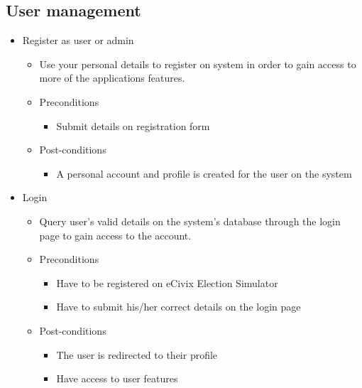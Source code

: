 \documentclass{article}
\begin{document}
   	\subsection{User management} 
   		 \begin{itemize}
    				\item Register as user or admin
				\begin{itemize}
					\item Use your personal details to register on system in order to gain access to more of the applications features.

					\item Preconditions
					\begin{itemize}
						\item Submit details on registration form
					\end{itemize}
					\item Post-conditions
					\begin{itemize}
						\item A personal account and profile is created for the user on the system
					\end{itemize}
				\end{itemize}
				
				\item Login
				\begin{itemize}
					\item Query user’s valid details on the system’s database through the login page to gain access to the account. 
					\item Preconditions
					\begin{itemize}
						\item Have to be registered on eCivix Election Simulator
						\item Have to submit his/her correct details on the login page
					\end{itemize}
					\item Post-conditions
					\begin{itemize}
						\item The user is redirected to their profile
						\item Have access to user features
					\end{itemize}
				\end{itemize}
				

\end{itemize}
\end{document}
